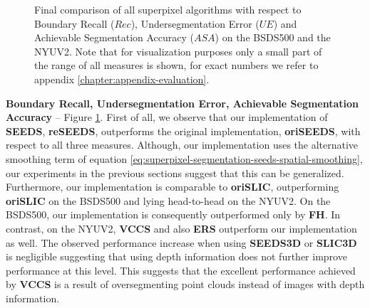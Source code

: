 \begin{figure}[t]
{	}
	\caption[Final comparison of several superpixel algorithms with respect to Boundary Recall, Undersegmentation Error and Achievable Segmentation Accuracy on the test sets of the Berkeley Segmentation Dataset \cite{ArbelaezMaireFowlkesMalik:2011} and the NYU Depth Dataset \cite{SilbermanHoiemKohliFergus:2012}.]{Final comparison of all superpixel algorithms with respect to Boundary Recall ($Rec$), Undersegmentation Error ($UE$) and Achievable Segmentation Accuracy ($ASA$) on the BSDS500 and the NYUV2. Note that for visualization purposes  only a small part of the range of all measures is shown, for exact numbers we refer to appendix \ref{chapter:appendix-evaluation}.
	}
	\label{fig:evaluation-comparison-rec-ue}
\end{figure}
\textbf{Boundary Recall, Undersegmentation Error, Achievable Segmentation Accuracy} -- Figure \ref{fig:evaluation-comparison-rec-ue}.
First of all, we observe that our implementation of \textbf{SEEDS}, \textbf{reSEEDS}, outperforms the original implementation, \textbf{oriSEEDS}, with respect to all three measures. Although, our implementation uses the alternative smoothing term of equation \eqref{eq:superpixel-segmentation-seeds-spatial-smoothing}, our experiments in the previous sections suggest that this can be generalized. Furthermore, our implementation is comparable to \textbf{oriSLIC}, outperforming \textbf{oriSLIC} on the BSDS500 and lying head-to-head on the NYUV2. On the BSDS500, our implementation is consequently outperformed only by \textbf{FH}. In contrast, on the NYUV2, \textbf{VCCS} and also \textbf{ERS} outperform our implementation as well. The observed performance increase when using \textbf{SEEDS3D} or \textbf{SLIC3D} is negligible suggesting that using depth information does not further improve performance at this level. This suggests that the excellent performance achieved by \textbf{VCCS} is a result of oversegmenting point clouds instead of images with depth information.

